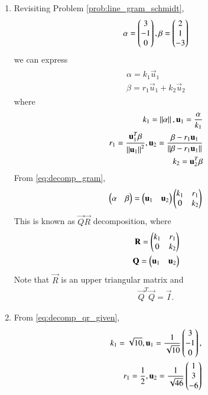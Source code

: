 \renewcommand{\theequation}{\theenumi}
\begin{enumerate}[label=\thesection.\arabic*.,ref=\thesection.\theenumi]

\item Revisiting Problem \eqref{prob:line_gram_schmidt},
%
\begin{align}
\label{eq:decomp_qr_given}
{\alpha} = \begin{pmatrix}3\\-1\\0\end{pmatrix},
 {\beta} = \begin{pmatrix}2\\1\\-3\end{pmatrix}
\end{align}
%
we can express
\begin{align}
\begin{split}
\alpha = k_1\vec{u}_1 
\\
\beta = r_1\vec{u}_1 +k_2\vec{u}_2
\end{split}
\label{eq:decomp_gram}
\end{align}
%
where 
\begin{align}
k_1 = \left\lVert\alpha\right\rVert, \mathbf{u}_1 = \frac{\mathbf{\alpha}}{k_1} 
\\
r_1 = \frac{\mathbf{u}_1^T\beta}{\left\lVert\mathbf{u}_1\right\rVert^2}, 
\mathbf{u}_2 = \frac{\beta - r_1 \mathbf{u}_1}{\left\lVert\beta - r_1 \mathbf{u}_1\right\rVert}
\\
k_2 = {\mathbf{u}_2^T\beta}
\end{align}
From \eqref{eq:decomp_gram}, 
\begin{align}
\begin{pmatrix}\alpha & \beta \end{pmatrix} = \begin{pmatrix}\mathbf{u}_1 & \mathbf{u}_2\end{pmatrix}\begin{pmatrix}k_1 & r_1 \\ 0 & k_2\end{pmatrix} 
\end{align}
%
This is known as $\vec{Q}\vec{R}$ decomposition, where 
\begin{align}
\mathbf{R} = \begin{pmatrix}k_1 & r_1 \\ 0 & k_2\end{pmatrix} 
\\
\mathbf{Q} = \begin{pmatrix}\mathbf{u}_1 & \mathbf{u}_2\end{pmatrix}
\end{align}
%
Note that $\vec{R}$ is an upper triangular matrix and 
\begin{align}
\vec{Q}^T\vec{Q} = \vec{I}.
\end{align}
\item From \eqref{eq:decomp_qr_given},
\begin{align}
k_1 = \sqrt{10}, \vec{u}_1 = \frac{1}{\sqrt{10}} \myvec{3\\-1\\0},
\\
r_1 = \frac{1}{2}, \vec{u}_2 = \frac{1}{\sqrt{46}}\myvec{1\\3\\-6}

\end{align}
\end{enumerate}
